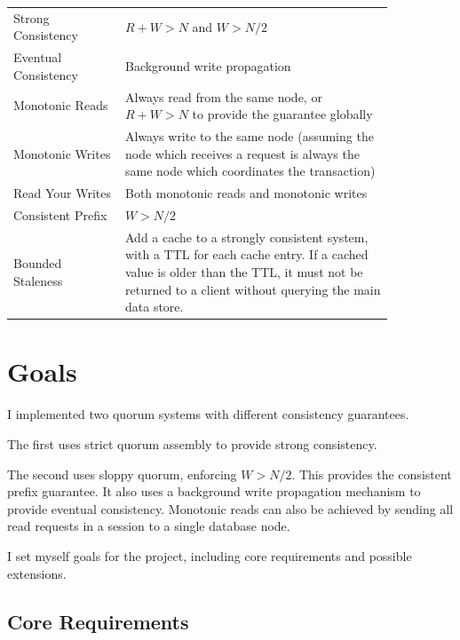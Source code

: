 \documentclass[12pt,a4paper,twoside,openany]{report}
\begin{document}
\begin{table}[ht!]
\centering
\renewcommand{\arraystretch}{1.3}
\begin{tabular}{@{} m{0.25\linewidth} p{0.6\linewidth} @{}}
\toprule
Strong Consistency & $R + W > N$ and $W > N/2$\\
Eventual Consistency & Background write propagation\\
Monotonic Reads & Always read from the same node, or $R + W > N$ to provide the guarantee globally\\
Monotonic Writes & Always write to the same node (assuming the node which receives a request is always the same node which coordinates the transaction)\\
Read Your Writes & Both monotonic reads and monotonic writes\\
Consistent Prefix & $W > N/2$\\
Bounded Staleness & Add a cache to a strongly consistent system, with a TTL for each cache entry. If a cached value is older than the TTL, it must not be returned to a client without querying the main data store.\\
\bottomrule
\end{tabular}
\end{table}

\section{Goals}

I implemented two quorum systems with different consistency guarantees.

The first uses strict quorum assembly to provide strong consistency.

The second uses sloppy quorum, enforcing $W > N/2$. This provides the consistent prefix guarantee. It also uses a background write propagation mechanism to provide eventual consistency. Monotonic reads can also be achieved by sending all read requests in a session to a single database node.

I set myself goals for the project, including core requirements and possible extensions.

\subsection{Core Requirements}
\end{document}
